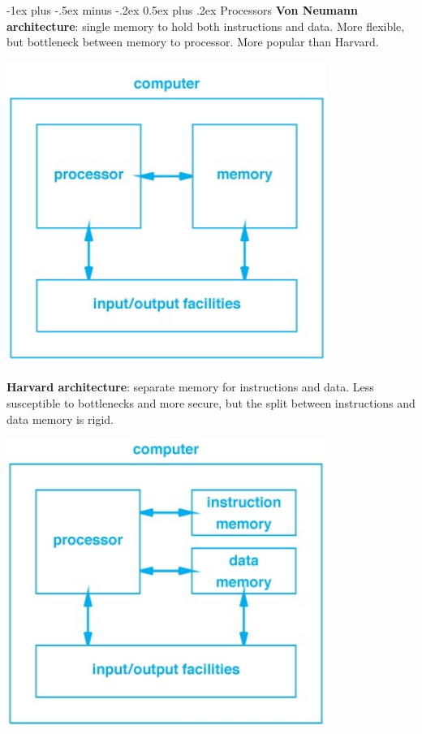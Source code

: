 \documentclass[10pt,landscape]{article}
\makeatletter
\renewcommand{\section}{\@startsection{section}{1}{0mm}%
                                {-1ex plus -.5ex minus -.2ex}%
                                {0.5ex plus .2ex}%
                                {\normalfont\large\bfseries}}
\makeatother
\begin{document}
\begin{multicols}{3}
\section{Processors}
\textbf{Von Neumann architecture}: single memory to hold both instructions and data. More flexible, but bottleneck between memory to processor. More popular than Harvard.\\
{\centering\includegraphics[scale=0.35]{img/vna.png}\par}
\textbf{Harvard architecture}: separate memory for instructions and data. Less susceptible to bottlenecks and more secure, but the split between instructions and data memory is rigid.\\
{\centering\includegraphics[scale=0.35]{img/ha.png}\par}

\end{multicols}
\end{document}
